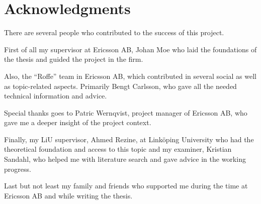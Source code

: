 \chapter*{Acknowledgments}

There are several people who contributed to the success of this project. 

First of all my supervisor at Ericsson AB, Johan Moe who laid the foundations of the thesis and guided the project in the firm.

Also, the ``Roffe'' team in Ericsson AB, which contributed in several social as well as topic-related aspects. Primarily Bengt Carlsson, who gave all the needed technical information and advice. 

Special thanks goes to Patric Wernqvist, project manager of Ericsson AB, who gave me a deeper insight of the project context.

Finally, my LiU supervisor, Ahmed Rezine, at Linköping University who had the theoretical foundation and access to this topic and my examiner, Kristian Sandahl, who helped me with literature search and gave advice in the working progress. 

Last but not least my family and friends who supported me during the time at Ericsson AB and while writing the thesis.
